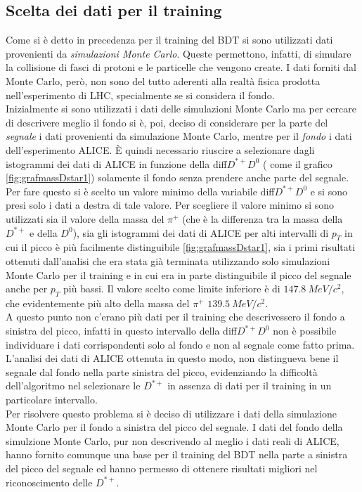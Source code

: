 \subsection{Scelta dei dati per il training}
Come si è detto in precedenza per il training del BDT si sono utilizzati dati provenienti da \textit{simulazioni Monte Carlo}. Queste permettono, infatti, di simulare la collisione di fasci di protoni e le particelle che vengono create. I dati forniti dal Monte Carlo, però, non sono del tutto aderenti alla realtà fisica prodotta nell'esperimento di LHC, specialmente se si considera il fondo. 
\\ Inizialmente si sono utilizzati i dati delle simulazioni Monte Carlo ma per cercare di descrivere meglio il fondo si è, poi, deciso di considerare per la parte del \textit{segnale} i dati provenienti da simulazione Monte Carlo, mentre per il \textit{fondo} i dati dell'esperimento ALICE. È quindi necessario riuscire a selezionare dagli istogrammi dei dati di ALICE in funzione della diff${D^{*+}D^0}$ ( come il grafico \ref{fig:grafmassDstar1}) solamente il fondo senza prendere anche parte del segnale. Per fare questo si è scelto un valore minimo della variabile diff${D^{*+}D^0}$ e si sono presi solo i dati a destra di tale valore. Per scegliere il valore minimo si sono utilizzati sia il valore della massa del $\pi^+$ (che è la differenza tra la massa della $D^{*+}$ e della $D^0$), sia gli istogrammi dei dati di ALICE per alti intervalli di $p_T$ in cui il picco è più facilmente distinguibile \ref{fig:grafmassDstar1}, sia i primi risultati ottenuti dall'analisi che era stata già terminata utilizzando solo simulazioni Monte Carlo per il training e in cui era in parte distinguibile il picco del segnale anche per $p_T$ più bassi. Il valore scelto come limite inferiore è di $147.8 \ MeV/c^2$, che evidentemente più alto della massa del $\pi^+$ $139.5 \ MeV/c^2$.
\\A questo punto non c'erano più dati per il training che descrivessero il fondo a sinistra del picco, infatti in questo intervallo della diff${D^{*+}D^0}$ non è possibile individuare i dati corrispondenti solo al fondo e non al segnale come fatto prima. L'analisi dei dati di ALICE  ottenuta in questo modo, non distingueva bene il segnale dal fondo nella parte sinistra del picco, evidenziando la difficoltà dell'algoritmo nel selezionare le $D^{*+}$ in assenza di dati per il training in un particolare intervallo. 
\\Per risolvere questo problema si è deciso di utilizzare i dati della simulazione Monte Carlo per il fondo a sinistra del picco del segnale. I dati del fondo della simulzione Monte Carlo, pur non descrivendo al meglio i dati reali di ALICE, hanno fornito comunque una base per il training del BDT nella parte a sinistra del picco del segnale ed hanno permesso di ottenere risultati migliori nel riconoscimento delle $D^{*+}$. 
